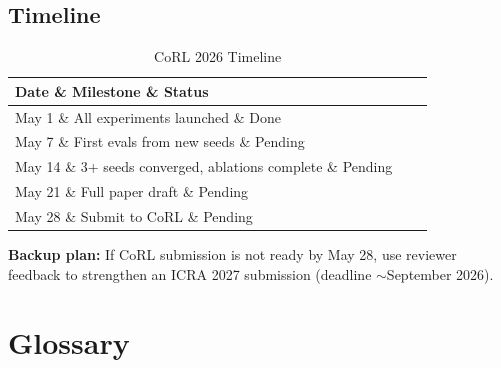 \documentclass[11pt,a4paper]{report}
\begin{document}
\section{Timeline}

\begin{table}[h]
\centering
\caption{CoRL 2026 Timeline}
\begin{tabular}{@{}lll@{}}
\toprule
\textbf{Date} \& \textbf{Milestone} \& \textbf{Status} \\
\midrule
May 1 \& All experiments launched \& Done \\
May 7 \& First evals from new seeds \& Pending \\
May 14 \& 3+ seeds converged, ablations complete \& Pending \\
May 21 \& Full paper draft \& Pending \\
May 28 \& Submit to CoRL \& Pending \\
\bottomrule
\end{tabular}
\end{table}

\begin{infobox}
\textbf{Backup plan:} If CoRL submission is not ready by May 28, use reviewer feedback to strengthen an ICRA 2027 submission (deadline $\sim$September 2026).
\end{infobox}

\chapter{Glossary}
\label{chap:glossary}
\end{document}
